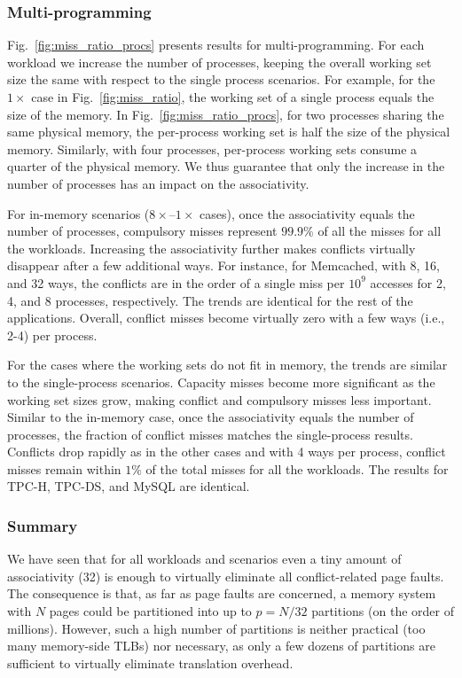 \subsubsection{Multi-programming}
Fig.~\ref{fig:miss_ratio_procs} presents results for multi-programming. For each workload we increase the number of processes, keeping the overall working set size the same with respect to the single process scenarios. For example, for the $1\times$ case in Fig.~\ref{fig:miss_ratio}, the working set of a single process equals the size of the memory. In Fig.~\ref{fig:miss_ratio_procs}, for two processes sharing the same physical memory, the per-process working set is half the size of the physical memory. Similarly, with four processes, per-process working sets consume a quarter of the physical memory. We thus guarantee that only the increase in the number of processes has an impact on the associativity. 

For in-memory scenarios ($8\times$--$1\times$ cases), once the associativity equals the number of processes, compulsory misses represent $99.9\%$ of all the misses for all the workloads. Increasing the associativity further makes conflicts virtually disappear after a few additional ways. For instance, for Memcached, with 8, 16, and 32 ways, the conflicts are in the order of a single miss per $10^{9}$ accesses for 2, 4, and 8 processes, respectively. The trends are identical for the rest of the applications. Overall, conflict misses become virtually zero with a few ways (i.e., 2-4) per process.

For the cases where the working sets do not fit in memory, the trends are similar to the single-process scenarios. Capacity misses become more significant as the working set sizes grow, making conflict and compulsory misses less important. Similar to the in-memory case, once the associativity equals the number of processes, the fraction of conflict misses matches the single-process results. Conflicts drop rapidly as in the other cases and with 4 ways per process, conflict misses remain within $1\%$ of the total misses for all the workloads. The results for TPC-H, TPC-DS, and MySQL are identical.

\subsubsection{Summary}
We have seen that for all workloads and scenarios even a tiny amount of associativity (32) is enough to virtually eliminate all conflict-related page faults. The consequence is that, as far as page faults are concerned, a memory system with $N$ pages could be partitioned into up to $p=N/32$ partitions (on the order of millions). However, such a high number of partitions is neither practical (too many memory-side TLBs) nor necessary, as only a few dozens of partitions are sufficient to virtually eliminate translation overhead. 


